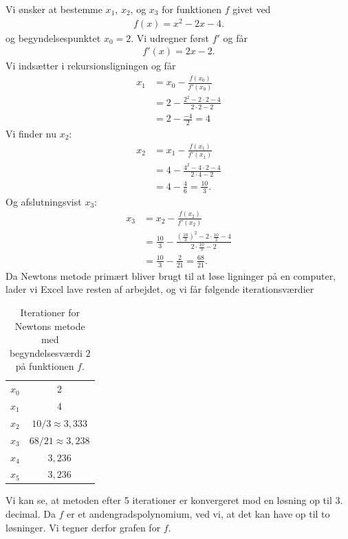 \begin{exa}
	Vi ønsker at bestemme $x_1$, $x_2$, og $x_3$ for funktionen $f$ givet ved
	\begin{align*}
		f(x) = x^2 - 2x - 4.
	\end{align*}
	og begyndelsespunktet $x_0 = 2$. 
	Vi udregner først $f'$ og får
	\begin{align*}
		f'(x) = 2x - 2.
	\end{align*}
	Vi indsætter i rekursionsligningen og får
	\begin{align*}
		x_1 &= x_0 - \frac{f(x_0)}{f'(x_0)}\\
		&= 2 - \frac{2^2-2\cdot 2 - 4}{2\cdot 2 - 2}\\
		&= 2 - \frac{-4}{2} = 4
	\end{align*}
	Vi finder nu $x_2$:
	\begin{align*}
		x_2 &= x_1 -\frac{f(x_1)}{f'(x_1)}\\
		&= 4 - \frac{4^2 - 4\cdot 2 - 4}{2\cdot 4 - 2}\\
		&= 4 - \frac{4}{6} = \frac{10}{3}. 
	\end{align*}
	Og afslutningsvist $x_3$:
	\begin{align*}
		x_3 &= x_2 - \frac{f(x_2)}{f'(x_2)}\\
		 &= \frac{10}{3} - \frac{\left(\frac{10}{3}\right)^2-2\cdot \frac{10}{3} - 4}{2\cdot \frac{10}{3} - 2}\\
		 &= \frac{10}{3} - \frac{2}{21} = \frac{68}{21}.
	\end{align*}
	Da Newtons metode primært bliver brugt til at løse ligninger på en computer, lader vi Excel lave resten af arbejdet, og vi får følgende iterationsværdier
	\begin{table}[H]
		\centering
		\begin{tabular}{cc}
			$x_0$ &2\\
			$x_1$ & 4\\
			$x_2$ & $10/3 \approx 3,\!333$\\
			$x_3$ & $68/21 \approx 3,\!238$\\
			$x_4$ &  $3,\!236$\\
			$x_5$ & $3,\!236$
		\end{tabular}
		\caption{Iterationer for Newtons metode med begyndelsesværdi $2$ på funktionen $f$.}
	\end{table}
	Vi kan se, at metoden efter 5 iterationer er konvergeret mod en løsning op til 3. decimal. Da $f$ er et andengradspolynomium, ved vi, at det kan have op til to løsninger. Vi tegner derfor grafen for $f$.

\end{exa}
